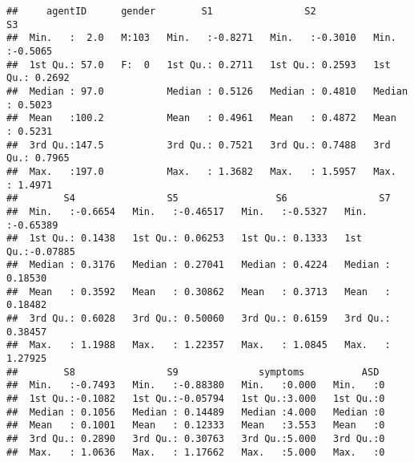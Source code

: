\documentclass[]{article}
\newenvironment{Shaded}{\begin{snugshade}}{\end{snugshade}}
\newcommand{\KeywordTok}[1]{\textcolor[rgb]{0.13,0.29,0.53}{\textbf{#1}}}
\newcommand{\StringTok}[1]{\textcolor[rgb]{0.31,0.60,0.02}{#1}}
\newcommand{\CommentTok}[1]{\textcolor[rgb]{0.56,0.35,0.01}{\textit{#1}}}
\newcommand{\OperatorTok}[1]{\textcolor[rgb]{0.81,0.36,0.00}{\textbf{#1}}}
\newcommand{\NormalTok}[1]{#1}
\begin{document}
\begin{verbatim}
##     agentID      gender        S1                S2                S3         
##  Min.   :  2.0   M:103   Min.   :-0.8271   Min.   :-0.3010   Min.   :-0.5065  
##  1st Qu.: 57.0   F:  0   1st Qu.: 0.2711   1st Qu.: 0.2593   1st Qu.: 0.2692  
##  Median : 97.0           Median : 0.5126   Median : 0.4810   Median : 0.5023  
##  Mean   :100.2           Mean   : 0.4961   Mean   : 0.4872   Mean   : 0.5231  
##  3rd Qu.:147.5           3rd Qu.: 0.7521   3rd Qu.: 0.7488   3rd Qu.: 0.7965  
##  Max.   :197.0           Max.   : 1.3682   Max.   : 1.5957   Max.   : 1.4971  
##        S4                S5                 S6                S7          
##  Min.   :-0.6654   Min.   :-0.46517   Min.   :-0.5327   Min.   :-0.65389  
##  1st Qu.: 0.1438   1st Qu.: 0.06253   1st Qu.: 0.1333   1st Qu.:-0.07885  
##  Median : 0.3176   Median : 0.27041   Median : 0.4224   Median : 0.18530  
##  Mean   : 0.3592   Mean   : 0.30862   Mean   : 0.3713   Mean   : 0.18482  
##  3rd Qu.: 0.6028   3rd Qu.: 0.50060   3rd Qu.: 0.6159   3rd Qu.: 0.38457  
##  Max.   : 1.1988   Max.   : 1.22357   Max.   : 1.0845   Max.   : 1.27925  
##        S8                S9              symptoms          ASD   
##  Min.   :-0.7493   Min.   :-0.88380   Min.   :0.000   Min.   :0  
##  1st Qu.:-0.1082   1st Qu.:-0.05794   1st Qu.:3.000   1st Qu.:0  
##  Median : 0.1056   Median : 0.14489   Median :4.000   Median :0  
##  Mean   : 0.1001   Mean   : 0.12333   Mean   :3.553   Mean   :0  
##  3rd Qu.: 0.2890   3rd Qu.: 0.30763   3rd Qu.:5.000   3rd Qu.:0  
##  Max.   : 1.0636   Max.   : 1.17662   Max.   :5.000   Max.   :0
\end{verbatim}

\begin{Shaded}
\end{Shaded}
\end{document}
